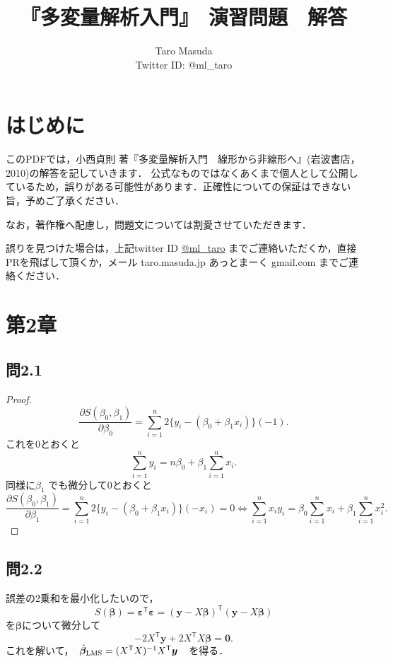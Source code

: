 \documentclass[pdflatex,ja=standard]{bxjsarticle}
\title{『多変量解析入門』　演習問題　解答}
\author{Taro Masuda \\ Twitter ID: @ml\_taro}
\begin{document}
\maketitle

\section{はじめに}
このPDFでは，小西貞則 著『多変量解析入門　線形から非線形へ』(岩波書店，2010)の解答を記していきます．
公式なものではなくあくまで個人として公開しているため，誤りがある可能性があります．正確性についての保証はできない旨，予めご了承ください．

なお，著作権へ配慮し，問題文については割愛させていただきます．

誤りを見つけた場合は，上記twitter ID \href{https://twitter.com/ml_taro}{@ml\_taro} までご連絡いただくか，直接PRを飛ばして頂くか，メール taro.masuda.jp あっとまーく gmail.com までご連絡ください．

\section{第2章}

\subsection{問2.1}

\begin{proof}
\begin{equation}
\frac{\partial S(\beta_{0}, \beta_{1})}{\partial \beta_{0}} =  \sum_{i=1}^{n} 2 \{ y_i - ( \beta_0 + \beta_1 x_i )  \}  (-1) .
\end{equation}
これを0とおくと
\begin{equation}
\sum_{i=1}^{n} y_i = n \beta_0 + \beta_1 \sum_{i=1}^{n} x_i. 
\end{equation}
同様に$\beta_1$ でも微分して0とおくと
\begin{equation}
\frac{\partial S(\beta_{0}, \beta_{1})}{\partial \beta_{1}} =  \sum_{i=1}^{n} 2 \{ y_i - ( \beta_0 + \beta_1 x_i )  \} (-x_i) = 0
\iff \sum_{i=1}^{n} x_i y_i =  \beta_0 \sum_{i=1}^{n} x_i + \beta_1 \sum_{i=1}^{n} x_i^2.
\end{equation}
\end{proof}

\subsection{問2.2}
誤差の2乗和を最小化したいので，
\begin{equation}
S(\bm{\beta}) = \bm{\varepsilon}^{\mathsf{T}} \bm{\varepsilon} = (\bm{y} - X \bm{\beta})^{\mathsf{T}} (\bm{y} - X \bm{\beta})
\end{equation}
を$\bm{\beta}$について微分して
\begin{equation}
- 2 X^{\mathsf{T}} \bm{y} + 2 X^{\mathsf{T}}X \bm{\beta} = \bm{0}. 
\end{equation}
これを解いて，　$\hat{\bm{\beta}}_{\rm{LMS}} = (X^{\mathsf{T}} X)^{-1} X^{\mathsf{T}} \bm{y}$　を得る．
\end{document}

